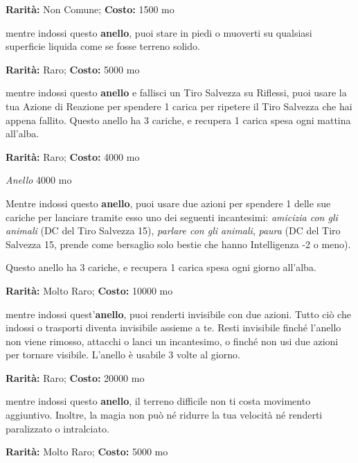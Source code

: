 \begin{multicols}{2}
\textbf{Rarità:} Non Comune; \textbf{Costo:} 1500 mo

mentre indossi questo \textbf{anello}, puoi stare in piedi o muoverti su qualsiasi superficie liquida come se fosse terreno solido.


\textbf{Rarità:} Raro; \textbf{Costo:} 5000 mo

mentre indossi questo \textbf{anello} e fallisci un Tiro Salvezza su Riflessi, puoi usare la tua Azione di Reazione per spendere 1 carica per ripetere il Tiro Salvezza che hai appena fallito. Questo anello ha 3 cariche, e recupera 1 carica spesa ogni mattina all'alba.


\textbf{Rarità:} Raro; \textbf{Costo:} 4000 mo

\emph{Anello} 4000 mo

Mentre indossi questo \textbf{anello}, puoi usare due azioni per spendere 1 delle sue cariche per lanciare tramite esso uno dei seguenti incantesimi: \emph{amicizia con gli animali} (DC del Tiro Salvezza 15), \emph{parlare con gli animali}, \emph{paura} (DC del Tiro Salvezza 15, prende come bersaglio solo bestie che hanno Intelligenza -2 o meno).

Questo anello ha 3 cariche, e recupera 1 carica spesa ogni giorno all'alba.


\textbf{Rarità:} Molto Raro; \textbf{Costo:} 10000 mo

mentre indossi quest'\textbf{anello}, puoi renderti invisibile con due azioni. Tutto ciò che indossi o trasporti diventa invisibile assieme a te. Resti invisibile finché l'anello non viene rimosso, attacchi o lanci un incantesimo, o finché non usi due azioni per tornare visibile. L'anello è usabile 3 volte al giorno.


\textbf{Rarità:} Raro; \textbf{Costo:} 20000 mo

mentre indossi questo \textbf{anello}, il terreno difficile non ti costa movimento aggiuntivo. Inoltre, la magia non può né ridurre la tua velocità né renderti paralizzato o intralciato.


\textbf{Rarità:} Molto Raro; \textbf{Costo:} 5000 mo


\end{multicols}
